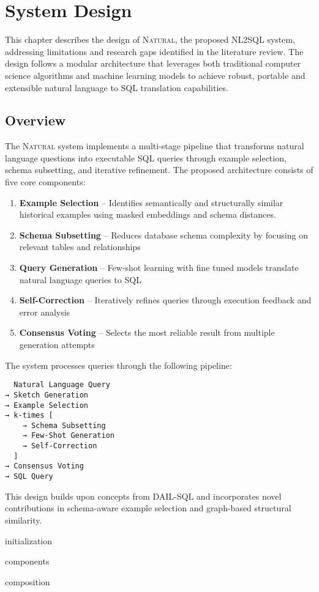 \section{System Design}

This chapter describes the design of \textsc{Natural}, the proposed NL2SQL system, 
addressing limitations and research gaps identified in the literature review.
The design follows a modular architecture that leverages both traditional computer
science algorithms and machine learning models to achieve robust, portable and
extensible natural language to SQL translation capabilities.

\subsection{Overview}

The \textsc{Natural} system implements a multi-stage pipeline that transforms natural
language questions into executable SQL queries through example selection,
schema subsetting, and iterative refinement. The proposed architecture consists
of five core components:

\begin{enumerate}
    \item \textbf{Example Selection} – Identifies semantically and structurally similar
        historical examples using masked embeddings and schema distances.
    \item \textbf{Schema Subsetting} – Reduces database schema complexity by focusing
        on relevant tables and relationships
    \item \textbf{Query Generation} – Few-shot learning with fine tuned models translate natural language queries to SQL
    \item \textbf{Self-Correction} – Iteratively refines queries through execution feedback and error analysis
    \item \textbf{Consensus Voting} – Selects the most reliable result from multiple
        generation attempts
\end{enumerate}

The system processes queries through the following pipeline:

\begin{verbatim}
  Natural Language Query 
→ Sketch Generation
→ Example Selection
→ k-times [
    → Schema Subsetting
    → Few-Shot Generation
    → Self-Correction
  ]
→ Consensus Voting
→ SQL Query
\end{verbatim}

This design builds upon concepts from DAIL-SQL \citep{DAIL} and incorporates novel
contributions in schema-aware example selection and graph-based structural similarity.

{initialization}

{components}

{composition}
